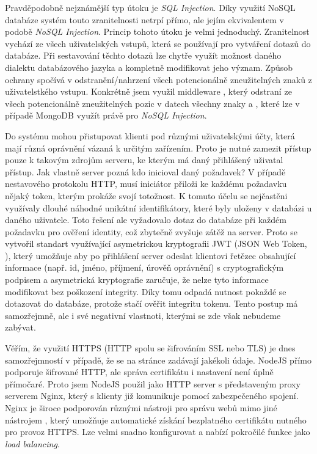 Pravděpodobně nejznámější typ útoku je \textit{SQL Injection}. Díky využití NoSQL databáze systém touto zranitelnosti netrpí přímo, ale jejím ekvivalentem v podobě \textit{NoSQL Injection}. Princip tohoto útoku je velmi jednoduchý. Zranitelnost vychází ze všech uživatelských vstupů, která se používají pro vytváření dotazů do databáze. Při sestavování těchto dotazů lze chytře využít možnost daného dialektu databázového jazyka a kompletně modifikovat jeho význam. Způsob ochrany spočívá v odstranění/nahrzení všech potencionálně zneužitelných znaků z uživatelstkého vstupu. Konkrétně jsem využil middleware , který odstraní ze všech potencionálně zneužitelných pozic v datech všechny znaky \uv{\$} a , které lze v případě MongoDB využít právě pro \textit{NoSQL Injection}.

Do systému mohou přistupovat klienti pod různými uživatelskými účty, která mají různá oprávnění vázaná k určitým zařízením. Proto je nutné zamezit přístup pouze k takovým zdrojům serveru, ke kterým má daný přihlášený uživatal přístup. Jak vlastně server pozná kdo inicioval daný požadavek? V případě nestavového protokolu HTTP, musí iniciátor přiloži ke každému požadavku nějaký token, kterým prokáže svojí totožnost. K tomuto účelu se nejčastěni využívaly dlouhé náhodné unikátní identifikátory, které byly uloženy v databázi u daného uživatele. Toto řešení ale vyžadovalo dotaz do databáze při každém požadavku pro ověření identity, což zbytečně zvyšuje zátěž na server. Proto se vytvořil standart využívající asymetrickou kryptografii JWT (JSON Web Token, \cite[RFC 7519]{rfc-jwt}), který umožňuje aby po přihlášení server odeslat klientovi řetězec obsahující informace (např. id, jméno, příjmení, úrověň oprávnění) s cryptografickým podpisem a asymetrická kryptografie zaručuje, že nelze tyto informace modifikovat bez poškození integrity. Díky tomu odpadá nutnost pokaždé se dotazovat do databáze, protože stačí ověřit integritu tokenu. Tento postup má samozřejmně, ale i své negativní vlastnoti, kterými se zde však nebudeme zabývat.

Věřím, že využití HTTPS (HTTP spolu se šifrováním SSL nebo TLS) je dnes samozřejmností v případě, že se na stránce zadávají jakékoli údaje. NodeJS přímo podporuje šifrované HTTP, ale správa certifikátu i nastavení není úplně přímočaré. Proto jsem NodeJS použil jako HTTP server s představeným proxy serverem Nginx, který s klienty již komunikuje pomocí zabezpečeného spojení. Nginx je široce podporován různými nástroji pro správu webů mimo jiné nástrojem , který umožňuje automatické získání bezplatného certifikátu nutného pro provoz HTTPS. Lze velmi snadno konfigurovat a nabízí pokročilé funkce jako \textit{load balancing}.

